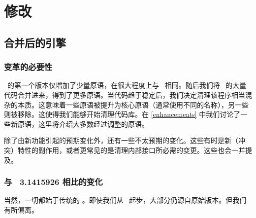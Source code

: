 \chapter{修改}\label{modifications}

\section{合并后的引擎}

\subsection{变革的必要性}


\LUATEX\ 的第一个版本仅增加了少量原语，在很大程度上与 \PDFTEX\ 相同。随后我们将 \ALEPH\ 的大量代码合并进来，得到了更多原语。当代码趋于稳定后，我们决定清理该程序相当混杂的本质。这意味着一些原语被提升为核心原语（通常使用不同的名称），另一些则被移除。这使得我们能够开始清理代码库。在 \ref{enhancements} 中我们讨论了一些新原语，这里将介绍大多数经过调整的原语。

除了由新功能引起的预期变化外，还有一些不太预期的变化。这些有时是新（冲突）特性的副作用，或者更常见的是清理内部接口所必需的变更。这些也会一并提及。

\subsection{与 \TEX\ 3.1415926 相比的变化}

\topicindex {\TEX}

当然，一切都始于传统的 \TEX。即使我们从 \PDFTEX\ 起步，大部分仍源自原始版本。但我们有所偏离。

